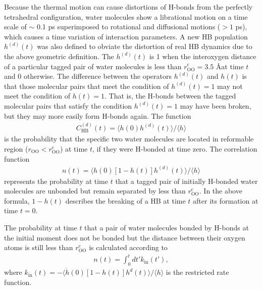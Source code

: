 Because the thermal motion can cause distortions of H-bonds from the perfectly tetrahedral configuration,
water molecules show a librational motion on a time scale of $\sim$ 0.1 ps superimposed to rotational and diffusional motions ($> 1$ ps), 
which causes a time variation of interaction parameters.
A new HB population $h^{(d)}(t)$ was also defined to obviate the distortion of real HB dynamics
due to the above geometric definition. \cite{Sciortino1989,Chandra2000}
The $h^{(d)}(t)$ is 1 when the interoxygen distance of a particular tagged pair of water molecules is less than $r^{\text{c}}_{\text{OO}}=3.5$ \AA at time $t$ and 0 otherwise. 
The difference between the operators $h^{(d)}(t)$ and $h(t)$ is that those molecular pairs that meet the condition of $h^{(d)}(t)=1$ may not meet the condition of $h(t)=1$.
That is, the H-bonds between the tagged molecular pairs that satisfy the condition $h^{(d)}(t)=1$ may have been broken, but they may more easily form H-bonds again.
The function 
\begin{eqnarray}
  C^{(d)}_{\text{HB}}(t)=\langle h(0)h^{(d)}(t) \rangle/\langle h\rangle
\label{eq:C_HB_d}
\end{eqnarray}
is the probability that the specific two water molecules are located in reformable region ($r_{\text{OO}} < r^{\text{c}}_{\text{OO}}$) at time $t$,
if they were H-bonded at time zero. 
The correlation function 
%
\begin{eqnarray}
n(t)=\langle h(0)[1-h(t)]h^{(d)}(t) \rangle/\langle h\rangle 
\label{eq:n_HB}
\end{eqnarray}
represents the probability at time $t$ 
that a tagged pair of initially H-bonded water molecules are unbonded but remain separated by less than $r_{\text{OO}}^{\text{c}}$.
In the above formula, $1-h(t)$ describes the breaking of a HB at time $t$ after its formation at time $t=0$.

The probability at time $t$ that a pair of water molecules bonded by H-bonds at the initial moment does not be bonded 
but the distance between their oxygen atoms is still less than $r_\text{OO}^c$ is calculated according to 
\begin{eqnarray}
n(t) = \int_0^t dt'k_\text{in}(t'),
\label{eq:n_from_k_in}
\end{eqnarray}
where $k_\text{in}(t) = -\langle \dot h(0)[1-h(t)]h^d(t) \rangle/\langle h\rangle$ is the restricted rate function. 
\FloatBarrier
